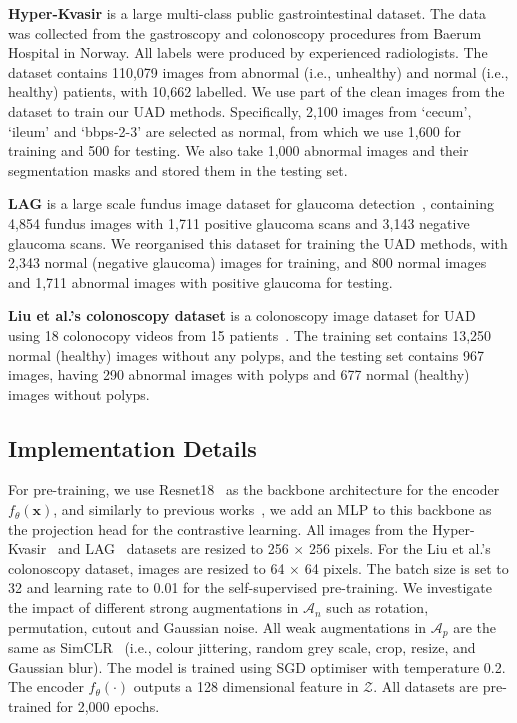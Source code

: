 \documentclass[runningheads]{llncs}
\begin{document}
\textbf{Hyper-Kvasir} is a large multi-class public gastrointestinal dataset. The data was collected from the gastroscopy and colonoscopy procedures from Baerum Hospital in Norway. 
All labels were produced by experienced radiologists. The dataset contains 110,079 images from abnormal (i.e., unhealthy) and normal (i.e., healthy) patients, with 10,662 labelled. We use part of the clean images from the dataset to train our UAD methods. 
Specifically, 2,100 images from `cecum', `ileum' and `bbps-2-3' are selected as normal, from which we use 1,600 for training and 500 for testing. We also take 1,000 abnormal images and their segmentation masks and stored them in the testing set. 

\textbf{LAG} is a large scale fundus image dataset for glaucoma detection~\cite{li2019attention}, containing 4,854 fundus images with 1,711 positive glaucoma scans and 3,143 negative glaucoma scans. We reorganised this dataset for training the UAD methods, with 2,343 normal (negative glaucoma) images for training, and 800 normal images and 1,711 abnormal images with positive glaucoma for testing.  


\textbf{Liu et al.'s colonoscopy dataset} is a colonoscopy image dataset for UAD using 18 colonocopy videos from 15
patients~\cite{liu2019photoshopping}. The training set contains 13,250 normal (healthy) images without any polyps, and the testing set contains 967 images, having 290 abnormal images with polyps and 677 normal (healthy) images without polyps. 

\subsection{Implementation Details}

For pre-training, we use Resnet18~\cite{he2016deep} as the backbone architecture for the encoder $f_{\theta}(\mathbf{x})$, and similarly to previous works~\cite{simclr,sohn2020learning}, we add an MLP to this backbone as the projection head for the contrastive learning. 
All images from the Hyper-Kvasir~\cite{borgli2020hyperkvasir} and LAG~\cite{li2019attention} datasets are resized to 256 $\times$ 256 pixels. 
For the Liu et al.'s colonoscopy dataset, images are resized to 64 $\times$ 64 pixels.  
The batch size is set to 32 and learning rate to 0.01 for the self-supervised pre-training.
We investigate the impact of different strong augmentations in $\mathcal{A}_n$ such as rotation, permutation, cutout and Gaussian noise. 
All weak augmentations in $\mathcal{A}_p$ are the same as SimCLR~\cite{simclr} (i.e., colour jittering, random grey scale, crop, resize, and Gaussian blur). 
The model is trained using SGD optimiser with  temperature 0.2. The encoder $f_{\theta}(\cdot)$ outputs a 128 dimensional feature in $\mathcal{Z}$. 
All datasets are pre-trained for 2,000 epochs. 
\end{document}
